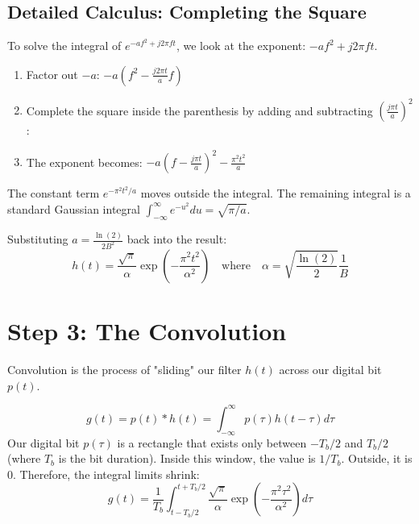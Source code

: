 \documentclass[12pt]{article}
\begin{document}
\subsection*{Detailed Calculus: Completing the Square}
To solve the integral of $e^{-af^2 + j2\pi ft}$, we look at the exponent: $-af^2 + j2\pi ft$.
\begin{enumerate}
    \item Factor out $-a$: $-a \left( f^2 - \frac{j2\pi t}{a}f \right)$
    \item Complete the square inside the parenthesis by adding and subtracting $\left( \frac{j\pi t}{a} \right)^2$:
    \item The exponent becomes: $-a \left( f - \frac{j\pi t}{a} \right)^2 - \frac{\pi^2 t^2}{a}$
\end{enumerate}
The constant term $e^{-\pi^2 t^2/a}$ moves outside the integral. The remaining integral is a standard Gaussian integral $\int_{-\infty}^{\infty} e^{-u^2} du = \sqrt{\pi/a}$. 

Substituting $a = \frac{\ln(2)}{2B^2}$ back into the result:
\begin{equation}
h(t) = \frac{\sqrt{\pi}}{\alpha} \exp\left( -\frac{\pi^2 t^2}{\alpha^2} \right) \quad \text{where} \quad \alpha = \sqrt{\frac{\ln(2)}{2}} \frac{1}{B}
\end{equation}

\section{Step 3: The Convolution}
Convolution is the process of "sliding" our filter $h(t)$ across our digital bit $p(t)$.

\begin{equation}
g(t) = p(t) * h(t) = \int_{-\infty}^{\infty} p(\tau) h(t-\tau) d\tau
\end{equation}
Our digital bit $p(\tau)$ is a rectangle that exists only between $-T_b/2$ and $T_b/2$ (where $T_b$ is the bit duration). Inside this window, the value is $1/T_b$. Outside, it is $0$. Therefore, the integral limits shrink:
\begin{equation}
g(t) = \frac{1}{T_b} \int_{t-T_b/2}^{t+T_b/2} \frac{\sqrt{\pi}}{\alpha} \exp\left( -\frac{\pi^2 \tau^2}{\alpha^2} \right) d\tau
\end{equation}
\end{document}
